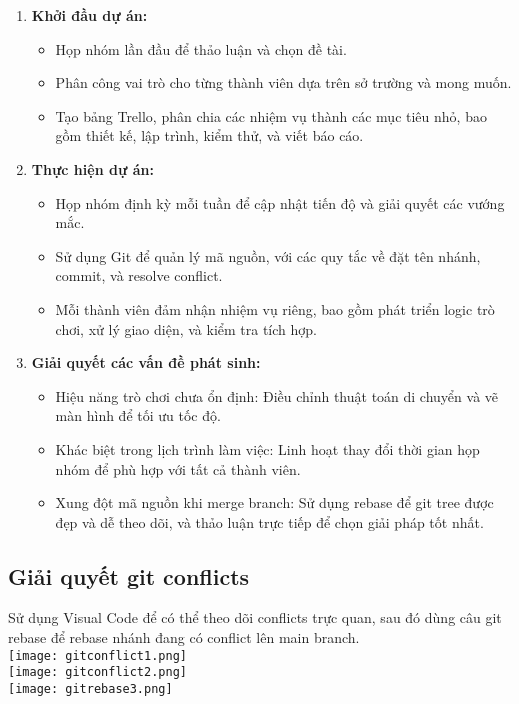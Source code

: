 \documentclass[a4paper, 12pt]{article}
\begin{document}
\begin{enumerate}
    \item \textbf{Khởi đầu dự án:}
    \begin{itemize}
        \item Họp nhóm lần đầu để thảo luận và chọn đề tài.
        \item Phân công vai trò cho từng thành viên dựa trên sở trường và mong muốn.
        \item Tạo bảng Trello, phân chia các nhiệm vụ thành các mục tiêu nhỏ, bao gồm thiết kế, lập trình, kiểm thử, và viết báo cáo.
    \end{itemize}
    
    \item \textbf{Thực hiện dự án:}
    \begin{itemize}
        \item Họp nhóm định kỳ mỗi tuần để cập nhật tiến độ và giải quyết các vướng mắc.
        \item Sử dụng Git để quản lý mã nguồn, với các quy tắc về đặt tên nhánh, commit, và resolve conflict.
        \item Mỗi thành viên đảm nhận nhiệm vụ riêng, bao gồm phát triển logic trò chơi, xử lý giao diện, và kiểm tra tích hợp.
    \end{itemize}
    
    \item \textbf{Giải quyết các vấn đề phát sinh:}
    \begin{itemize}
        \item Hiệu năng trò chơi chưa ổn định: Điều chỉnh thuật toán di chuyển và vẽ màn hình để tối ưu tốc độ.
        \item Khác biệt trong lịch trình làm việc: Linh hoạt thay đổi thời gian họp nhóm để phù hợp với tất cả thành viên.
        \item Xung đột mã nguồn khi merge branch: Sử dụng rebase để git tree được đẹp và dễ theo dõi, và thảo luận trực tiếp để chọn giải pháp tốt nhất.
    \end{itemize}
\end{enumerate}
\newpage
\subsection{Giải quyết git conflicts}
Sử dụng Visual Code để có thể theo dõi conflicts trực quan, sau đó dùng câu git rebase để rebase nhánh đang có conflict lên main branch.\\
\texttt{[image: gitconflict1.png]} \\
\texttt{[image: gitconflict2.png]} \\
\texttt{[image: gitrebase3.png]} \\
\end{document}
